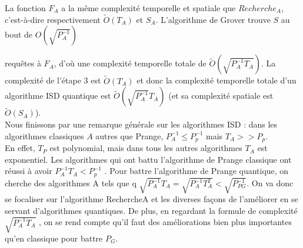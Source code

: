 \documentclass[12pt,openany]{report}
\begin{document}
La fonction $\mathit{F}_A$ a la même complexité temporelle et spatiale que $Recherche_A$,
c’est-à-dire respectivement $\tilde{O}(T_A)$ et $\mathit{S}_A$. L’algorithme de Grover trouve $\mathit{S}$ au
bout de $ O(\sqrt{P_{A}^{-1}})$

requêtes à $\mathit{F}_A$, d’où une complexité temporelle totale de $ \tilde{O}(\sqrt{P_A^{-1}T_A})$. La complexité de l’étape 3 est $\tilde{O}(T_A)$ et donc la complexité
temporelle totale d’un algorithme ISD quantique est $ \tilde{O}(\sqrt{P_A^{-1}}T_A)$ 
(et sa complexité spatiale est $\tilde{O}(S_A)$).\\
Nous finissons par une remarque générale sur les algorithmes ISD : dans les
algorithmes classiques $\mathit{A}$ autres que Prange, $ P_{A}^{-1} \leq P_p^{-1} $ mais $ T_A >> P_p $. \\
En effet, $T_P$ est polynomial, mais dans tous les autres algorithmes $T_A$ est
exponentiel. Les algorithmes qui ont battu l’algorithme de Prange classique
ont réussi à avoir $ P_A^{-1} T_A < P_p^{-1}$
. Pour battre l’algorithme de Prange quantique,
on cherche des algorithmes A tels que q
$\sqrt{P_A^{-1}}T_A =
\sqrt{P_A^{-1} T_A^2 } < \sqrt{P^{-1}_{
PG}}$.
On va donc se focaliser sur l’algorithme RechercheA et les diverses façons de
l’améliorer en se servant d’algorithmes quantiques. De plus, en regardant la formule de complexité $ \sqrt{P_A^{-1}T_A}  $
, on se rend compte qu’il faut des améliorations
bien plus importantes qu’en classique pour battre $P_G$.
\end{document}

